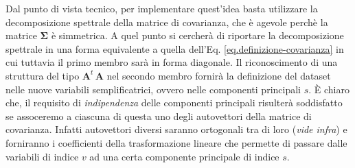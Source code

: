 \documentclass[11pt]{amsart}
\begin{document}
Dal punto di vista tecnico, per implementare quest'idea basta utilizzare la decomposizione spettrale della matrice di covarianza, che è agevole perchè la matrice $\bm \Sigma$ è simmetrica. A quel punto si cercherà di riportare la decomposizione spettrale in una forma equivalente a quella dell'Eq. \ref{eq.definizione-covarianza} in cui tuttavia il primo membro sarà in forma diagonale. Il riconoscimento di una struttura del tipo $\bm A^t \, \bm A$ nel secondo membro fornirà la definizione del dataset nelle nuove variabili semplificatrici, ovvero nelle componenti principali $s$. È chiaro che, il requisito di {\em indipendenza} delle componenti principali risulterà soddisfatto se assoceremo a ciascuna di questa uno degli autovettori della matrice di covarianza. Infatti autovettori diversi saranno ortogonali tra di loro ({\em vide infra}) e forniranno i coefficienti della trasformazione lineare che permette di passare dalle variabili di indice $v$ ad una certa componente principale di indice $s$.
\end{document}
